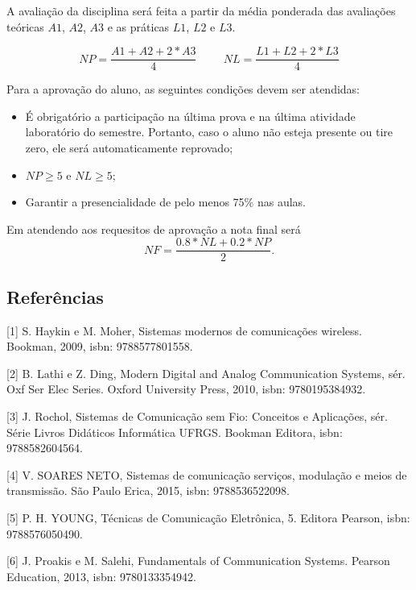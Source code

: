   A avaliação da disciplina será feita a partir da média ponderada das avaliações teóricas $A1$, $A2$, $A3$ e as práticas $L1$, $L2$ e $L3$.
  

  \begin{equation*}
      NP =  \frac{A1 + A2 + 2*A3}{4} \hspace{1cm} NL =  \frac{L1 + L2 + 2*L3}{4}
  \end{equation*}
  
  Para a aprovação do aluno, as seguintes condições devem ser atendidas:
    \begin{itemize}
      \item É obrigatório a participação na última prova e na última atividade laboratório do semestre. Portanto, caso o aluno não esteja presente ou tire zero, ele será automaticamente reprovado;
      \item $ NP \geq 5 $ e $ NL \geq 5 $;
      \item Garantir a presencialidade de pelo menos 75\% nas aulas.
    \end{itemize}
  Em atendendo  aos requesitos de aprovação a nota final será
  $$
  NF = \frac{0.8*NL + 0.2*NP}{2}.
  $$
 
  
   \newpage 
  \begin{snugshade}
    \section{Referências}
\end{snugshade}

[1] S. Haykin e M. Moher, Sistemas modernos de comunicações wireless. Bookman, 2009, isbn: 9788577801558.


[2] B. Lathi e Z. Ding, Modern Digital and Analog Communication Systems, sér. Oxf Ser Elec Series. Oxford University Press, 2010, isbn: 9780195384932.


[3] J. Rochol, Sistemas de Comunicação sem Fio: Conceitos e Aplicações, sér. Série Livros Didáticos Informática UFRGS. Bookman Editora, isbn: 9788582604564.


[4] V. SOARES NETO, Sistemas de comunicação serviços, modulação e meios de transmissão. São Paulo Erica, 2015, isbn: 9788536522098.


[5] P. H. YOUNG, Técnicas de Comunicação Eletrônica, 5. Editora Pearson, isbn: 9788576050490.


[6] J. Proakis e M. Salehi, Fundamentals of Communication Systems. Pearson Education, 2013, isbn: 9780133354942.